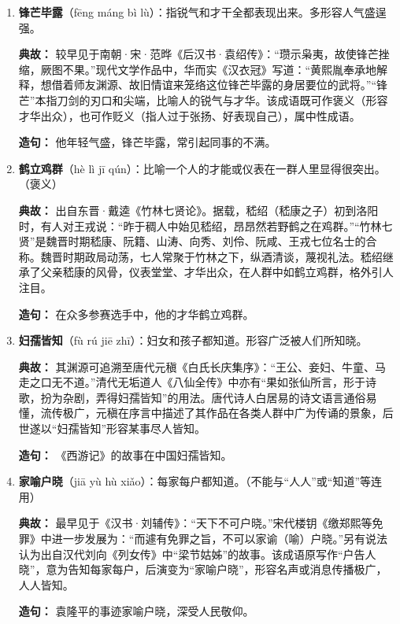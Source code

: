 \begin{enumerate}[leftmargin=*]
    \textbf{造句：} 他获得“优秀教师”称号，当之无愧。

    \item \textbf{锋芒毕露}（fēng máng bì lù）：指锐气和才干全都表现出来。多形容人气盛逞强。
    
    \textbf{典故：} 较早见于南朝·宋·范晔《后汉书·袁绍传》：“瓒示枭夷，故使锋芒挫缩，厥图不果。”现代文学作品中，华而实《汉衣冠》写道：“黄熙胤奉承地解释，想借着师友渊源、故旧情谊来笼络这位锋芒毕露的身居要位的武将。”“锋芒”本指刀剑的刃口和尖端，比喻人的锐气与才华。该成语既可作褒义（形容才华出众），也可作贬义（指人过于张扬、好表现自己），属中性成语。
    
    \textbf{造句：} 他年轻气盛，锋芒毕露，常引起同事的不满。

    \item \textbf{鹤立鸡群}（hè lì jī qún）：比喻一个人的才能或仪表在一群人里显得很突出。（褒义）
    
    \textbf{典故：} 出自东晋·戴逵《竹林七贤论》。据载，嵇绍（嵇康之子）初到洛阳时，有人对王戎说：“昨于稠人中始见嵇绍，昂昂然若野鹤之在鸡群。”“竹林七贤”是魏晋时期嵇康、阮籍、山涛、向秀、刘伶、阮咸、王戎七位名士的合称。魏晋时期政局动荡，七人常聚于竹林之下，纵酒清谈，蔑视礼法。嵇绍继承了父亲嵇康的风骨，仪表堂堂、才华出众，在人群中如鹤立鸡群，格外引人注目。
    
    \textbf{造句：} 在众多参赛选手中，他的才华鹤立鸡群。

    \item \textbf{妇孺皆知}（fù rú jiē zhī）：妇女和孩子都知道。形容广泛被人们所知晓。
    
    \textbf{典故：} 其渊源可追溯至唐代元稹《白氏长庆集序》：“王公、妾妇、牛童、马走之口无不道。”清代无垢道人《八仙全传》中亦有“果如张仙所言，形于诗歌，扮为杂剧，弄得妇孺皆知”的用法。唐代诗人白居易的诗文语言通俗易懂，流传极广，元稹在序言中描述了其作品在各类人群中广为传诵的景象，后世遂以“妇孺皆知”形容某事尽人皆知。
    
    \textbf{造句：} 《西游记》的故事在中国妇孺皆知。

    \item \textbf{家喻户晓}（jiā yù hù xiǎo）：每家每户都知道。（不能与“人人”或“知道”等连用）
    
    \textbf{典故：} 最早见于《汉书·刘辅传》：“天下不可户晓。”宋代楼钥《缴郑熙等免罪》中进一步发展为：“而遽有免罪之旨，不可以家谕（喻）户晓。”另有说法认为出自汉代刘向《列女传》中“梁节姑姊”的故事。该成语原写作“户告人晓”，意为告知每家每户，后演变为“家喻户晓”，形容名声或消息传播极广，人人皆知。
    
    \textbf{造句：} 袁隆平的事迹家喻户晓，深受人民敬仰。


\end{enumerate}

